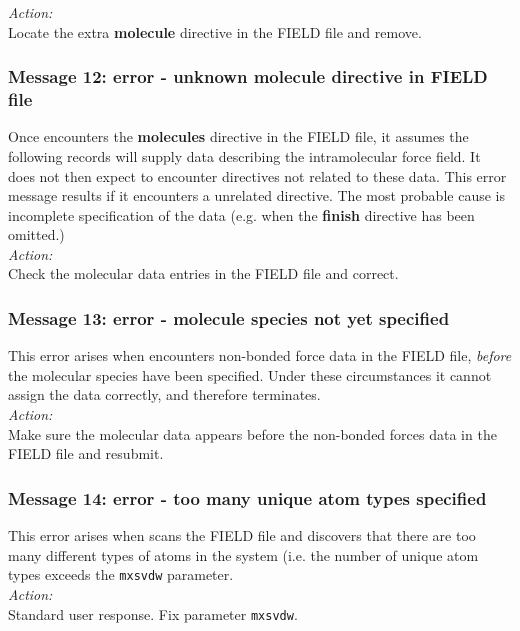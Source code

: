 \noindent
{\em Action:} \\ 
Locate the extra {\bf molecule} directive in the FIELD file and remove.

\subsubsection*{Message 12: error - unknown molecule directive in
FIELD file}

Once \D{} encounters the {\bf molecules} directive in the FIELD
file, it assumes the following records will supply data describing the
intramolecular force field. It does not then expect to encounter
directives not related to these data. This error message results if it
encounters a unrelated directive. The most probable cause is
incomplete specification of the data (e.g.  when the {\bf finish}
directive has been omitted.)\\

\noindent
{\em Action:} \\ 
Check the molecular data entries in the FIELD file and correct.

\subsubsection*{Message 13: error - molecule species not yet specified}

This error arises when \D{} encounters non-bonded  force data in
the FIELD file, {\em before} the molecular species have been
specified. Under these circumstances it cannot assign the data
correctly, and therefore terminates.\\

\noindent
{\em Action:} \\ 
Make sure the molecular data appears before the
non-bonded  forces data
in the FIELD file and resubmit.

\subsubsection*{Message 14: error - too many unique atom types  specified}

This error arises when \D{} scans the FIELD file and discovers that
there are too many different types of atoms in the system (i.e. the
number of unique atom types exceeds the {\tt mxsvdw} parameter.\\

\noindent
{\em Action:} \\ 
Standard user response. Fix parameter {\tt mxsvdw}.

